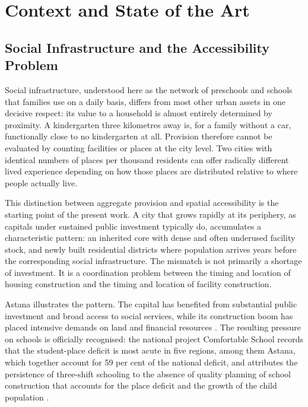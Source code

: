 \chapter{Context and State of the Art}
\label{ch:context}

\section{Social Infrastructure and the Accessibility Problem}
\label{sec:problem-context}

Social infrastructure, understood here as the network of preschools and schools that families use on a daily basis, differs from most other urban assets in one decisive respect: its value to a household is almost entirely determined by proximity. A kindergarten three kilometres away is, for a family without a car, functionally close to no kindergarten at all. Provision therefore cannot be evaluated by counting facilities or places at the city level. Two cities with identical numbers of places per thousand residents can offer radically different lived experience depending on how those places are distributed relative to where people actually live.

This distinction between aggregate provision and spatial accessibility is the starting point of the present work. A city that grows rapidly at its periphery, as capitals under sustained public investment typically do, accumulates a characteristic pattern: an inherited core with dense and often underused facility stock, and newly built residential districts where population arrives years before the corresponding social infrastructure. The mismatch is not primarily a shortage of investment. It is a coordination problem between the timing and location of housing construction and the timing and location of facility construction.

Astana illustrates the pattern. The capital has benefited from substantial public investment and broad access to social services, while its construction boom has placed intensive demands on land and financial resources \cite{astana2025}. The resulting pressure on schools is officially recognised: the national project Comfortable School records that the student-place deficit is most acute in five regions, among them Astana, which together account for 59 per cent of the national deficit, and attributes the persistence of three-shift schooling to the absence of quality planning of school construction that accounts for the place deficit and the growth of the child population \cite{comfortschool2022}.

